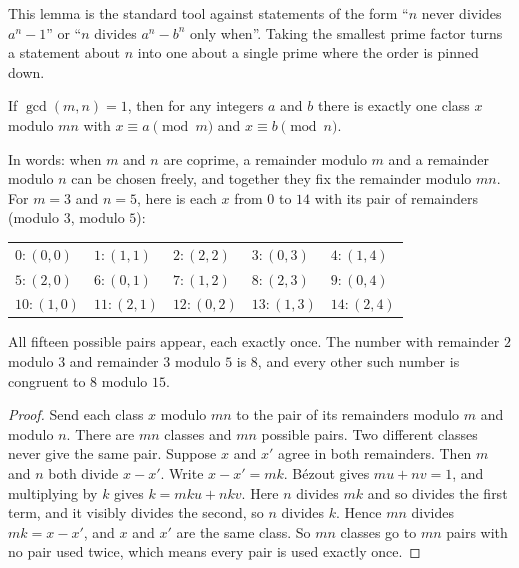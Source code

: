 This lemma is the standard tool against statements of the form ``$n$ never divides $a^n - 1$'' or ``$n$ divides $a^n - b^n$ only when''. Taking the smallest prime factor turns a statement about $n$ into one about a single prime where the order is pinned down.

\begin{theorem}
If $\gcd(m, n) = 1$, then for any integers $a$ and $b$ there is exactly one class $x$ modulo $mn$ with $x \equiv a \pmod m$ and $x \equiv b \pmod n$.
\end{theorem}

In words: when $m$ and $n$ are coprime, a remainder modulo $m$ and a remainder modulo $n$ can be chosen freely, and together they fix the remainder modulo $mn$. For $m = 3$ and $n = 5$, here is each $x$ from $0$ to $14$ with its pair of remainders (modulo $3$, modulo $5$):

\begin{center}\small
\begin{tabular}{lllll}
$0\colon (0,0)$ & $1\colon (1,1)$ & $2\colon (2,2)$ & $3\colon (0,3)$ & $4\colon (1,4)$ \\
$5\colon (2,0)$ & $6\colon (0,1)$ & $7\colon (1,2)$ & $8\colon (2,3)$ & $9\colon (0,4)$ \\
$10\colon (1,0)$ & $11\colon (2,1)$ & $12\colon (0,2)$ & $13\colon (1,3)$ & $14\colon (2,4)$ \\
\end{tabular}
\end{center}

All fifteen possible pairs appear, each exactly once. The number with remainder $2$ modulo $3$ and remainder $3$ modulo $5$ is $8$, and every other such number is congruent to $8$ modulo $15$.

\begin{proof}
Send each class $x$ modulo $mn$ to the pair of its remainders modulo $m$ and modulo $n$. There are $mn$ classes and $mn$ possible pairs. Two different classes never give the same pair. Suppose $x$ and $x'$ agree in both remainders. Then $m$ and $n$ both divide $x - x'$. Write $x - x' = mk$. B\'ezout gives $mu + nv = 1$, and multiplying by $k$ gives $k = mku + nkv$. Here $n$ divides $mk$ and so divides the first term, and it visibly divides the second, so $n$ divides $k$. Hence $mn$ divides $mk = x - x'$, and $x$ and $x'$ are the same class. So $mn$ classes go to $mn$ pairs with no pair used twice, which means every pair is used exactly once.
\end{proof}

